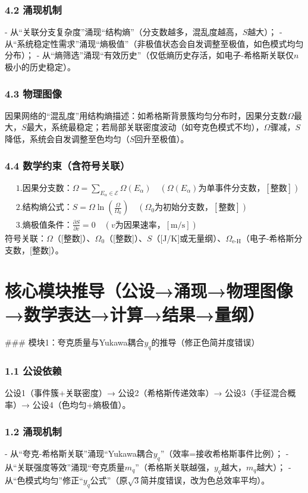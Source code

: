 \documentclass{article}
\begin{document}
\subsubsection{4.2 涌现机制}
- 从“关联分支复杂度”涌现“结构熵”（分支数越多，混乱度越高，\(S\)越大）；  
- 从“系统稳定性需求”涌现“熵极值”（非极值状态会自发调整至极值，如色模式均匀分布）；  
- 从“熵筛选”涌现“有效历史”（仅低熵历史存活，如电子-希格斯关联仅\(n\)极小的历史稳定）。

\subsubsection{4.3 物理图像}
因果网络的“混乱度”用结构熵描述：如希格斯背景簇均匀分布时，因果分支数\(\Omega\)最大，\(S\)最大，系统最稳定；若局部关联密度波动（如夸克色模式不均），\(\Omega\)骤减，\(S\)降低，系统会自发调整至色均匀（\(S\)回升至极值）。

\subsubsection{4.4 数学约束（含符号关联）}
\begin{align*}
&1. \text{因果分支数：}\Omega = \sum_{E_\alpha \in \mathcal{E}} \Omega(E_\alpha) \quad (\Omega(E_\alpha)为单事件分支数，[\text{整数}]) \\
&2. \text{结构熵公式：}S = \Omega \ln\left(\frac{\Omega}{\Omega_0}\right) \quad (\Omega_0为初始分支数，[\text{整数}]) \\
&3. \text{熵极值条件：}\frac{\partial S}{\partial v} = 0 \quad (v为因果速率，[\text{m/s}])
\end{align*}
符号关联：\(\Omega\)（[整数]）、\(\Omega_0\)（[整数]）、\(S\)（[J/K]或无量纲）、\(\Omega_{\text{e-H}}\)（电子-希格斯分支数，[整数]）。


\section{核心模块推导（公设→涌现→物理图像→数学表达→计算→结果→量纲）}
### 模块1：夸克质量与Yukawa耦合\(y_q\)的推导（修正色简并度错误）
\subsubsection{1.1 公设依赖}
公设1（事件簇+关联密度）→ 公设2（希格斯传递效率）→ 公设3（手征混合概率）→ 公设4（色均匀+熵极值）。

\subsubsection{1.2 涌现机制}
- 从“夸克-希格斯关联”涌现“Yukawa耦合\(y_q\)”（效率=接收希格斯事件比例）；  
- 从“关联强度等效”涌现“夸克质量\(m_q\)”（希格斯关联越强，\(y_q\)越大，\(m_q\)越大）；  
- 从“色模式均匀”修正“\(y_q\)公式”（原\(\sqrt{3}\)简并度错误，改为色总效率平均）。
\end{document}
